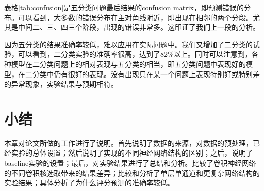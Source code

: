 表格\ref{tab:confusion}是五分类问题最后结果的confusion matrix，即预测错误的分布。可以看到，大多数的错误分布在主对角线附近，即出现在相邻的两个分段。尤其是中间二、三、四三个阶段，出现的错误非常多。这印证了我们上一段的分析。

因为五分类的结果准确率较低，难以应用在实际问题中。我们又增加了二分类的试验，可以看到，二分类实验的准确率很高，达到了82\%以上。同时可以注意到，各种模型在二分类问题上的相对表现与五分类的相当，即五分类问题中表现好的模型，在二分类中仍有很好的表现。没有出现只在某一个问题上表现特别好或特别差的异常现象，实验结果与预期相符。

\section{小结}
本章对论文所做的工作进行了说明。首先说明了数据的来源，对数据的预处理，已经实验的总体设置；然后说明了实现的不同神经网络结构的区别；之后，说明了baseline实验的设置；最后，对实验结果进行了总结和分析。比较了卷积神经网络的不同卷积核选取带来的结果差异；比较和分析了单层单通道和更复杂网络结构的实验结果；具体分析了为什么评分预测的准确率较低。
